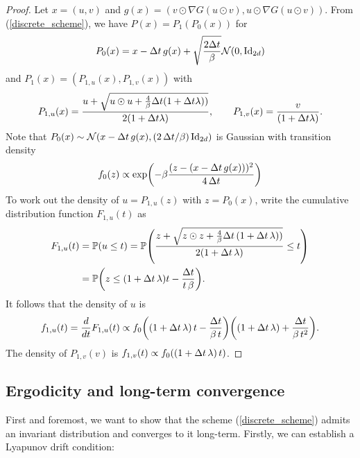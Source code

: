 \documentclass[11pt, twoside]{report}
\begin{document}
\begin{proof}
Let
$x = (u,v)$  and $g(x) = (v\odot \nabla G(u\odot v), u\odot \nabla G(u\odot v))$. From (\ref{discrete_scheme}), we have $P(x) = P_1(P_0(x))$ for
$$
P_0(x) = x - {\Delta t} \,g(x) + \sqrt{\frac{2{\Delta t}}{\beta} }\mathcal{N}(0,\mathrm{Id}_{2d})
$$
and $P_1(x)  = (P_{1,u}(x), P_{1,v}(x))$ with 
$$
P_{1,u}(x) = \frac{u + \sqrt{u\odot u + \frac{4}{\beta} {\Delta t} (1+{\Delta t} \lambda))}}{2(1+{\Delta t}\lambda)}, \qquad P_{1,v}(x) = \frac{v}{(1+{\Delta t}\lambda)}.
$$
Note that $ P_0(x) \sim\Nn\pa{x - \tstep \,g(x) , (2\,\tstep/\beta)\,\Id_{2d}  }$  is Gaussian with transition density
$$
f_0(z) \propto \exp\pa{ -\beta\frac{(z-(x-\tstep\, g(x)))^2}{4\,\tstep} }
$$
To work out the density of $u = P_{1,u}(z)$ with $z=P_0(x)$, write the  cumulative distribution function $F_{1,u}(t)$ as
\begin{align*}
    F_{1,u}(t) &= \PP(u\leq t) = \PP\pa{\frac{z + \sqrt{z\odot z + \frac{4}{\beta}\tstep\, (1+\tstep \,\lambda))}}{2(1+\tstep\,\lambda)} \leq t }\\
    &= \PP\pa{   z   \leq (1+\tstep\,\lambda) t - \frac{\tstep }{t\,\beta }}.
\end{align*}
It follows that the density of $u$ is
$$
f_{1,u}(t) = \frac{d}{dt}F_{1,u}(t) \propto f_0\pa{ (1+\tstep\,\lambda)\, t - \frac{\tstep}{\beta \,t} }  \pa{(1+\tstep\,\lambda) +  \frac{\tstep}{\beta \,t^2} }.
$$
%
The density of $P_{1,v}(v)$ is
$f_{1,v}(t)\propto f_0( (1+{\Delta t}\,\lambda)\,t)$.
\end{proof}

\subsection{Ergodicity and long-term convergence}
First and foremost, we want to show that the scheme (\ref{discrete_scheme}) admits an invariant distribution and converges to it long-term. Firstly, we can establish a Lyapunov drift condition:
\end{document}
